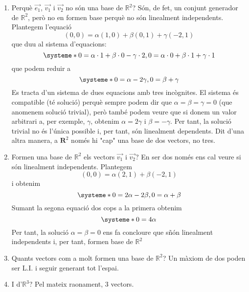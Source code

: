 \begin{enumerate}
\item Perquè $\overrightarrow{e_1}$, $\overrightarrow{v_1}$ i $\overrightarrow{v_2}$ no són una base de $\mathbb{R}^2$?
Són, de fet, un conjunt generador de $\mathbb{R}^2$, però no en formen base perquè no són linealment independents. Plantegem l'equació
\[(0,0) = \alpha (1,0) + \beta (0,1) +\gamma (-2,1)\]
que duu al sistema d'equacions:
\[
  \systeme*{0=\alpha\cdot 1 + \beta\cdot 0 - \gamma\cdot 2, 0=\alpha\cdot 0 + \beta\cdot 1 + \gamma \cdot 1}
\]
que podem reduir a 
\[
  \systeme*{0=\alpha - 2\gamma, 0=\beta + \gamma}
\]
Es tracta d'un sistema de dues equacions amb tres incògnites. El sistema és compatible (té solució) perquè sempre podem dir que $\alpha=\beta=\gamma=0$ (que anomenem solució trivial), però també podem veure que si donem un valor arbitrari a, per exemple, $\gamma$, obtenim $\alpha=2\gamma$ i $\beta=-\gamma$. Per tant, la solució trivial no és l'única possible i, per tant, són linealment dependents. Dit d'una altra manera, a $\mathbf{R}^2$ només hi "cap" una base de dos vectors, no tres.
\item Formen una base de $\mathbb{R}^2$ els vectors $\overrightarrow{v_1}$ i $\overrightarrow{v_2}$?
En ser dos només ens cal veure si són linealment independents. Plantegem
\[(0,0) = \alpha (2,1) + \beta (-2,1) \]
i obtenim
\[
  \systeme*{0=2\alpha- 2 \beta, 0=\alpha + \beta}
\]
Sumant la segona equació dos cops a la primera obtenim
\[
  \systeme*{0=4\alpha }
\]
Per tant, la solució $\alpha=\beta=0$ ens fa concloure que sñón linealment independents i, per tant, formen base de $\mathbb{R}^2$
\item Quants vectors com a molt formen una base de $\mathbb{R}^2$?
Un màxiom de dos poden ser L.I. i seguir generant tot l'espai.
\item I d'$\mathbb{R}^3$?
Pel mateix raonament, 3 vectors.
\end{enumerate}
\blacksquare

